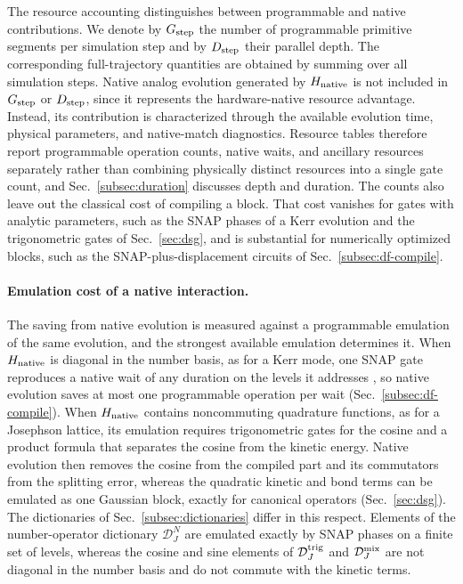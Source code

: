 \documentclass[pra,twocolumn,superscriptaddress,nofootinbib,floatfix]{revtex4-2}
\theoremstyle{remark}
\newcommand{\revcolor}{\color{blue}}
\DeclareRobustCommand{\rev}[1]{{\revcolor #1}}
\begin{document}
The resource accounting distinguishes between programmable and native contributions. We denote by \(G_{\rm step}\) the number of programmable primitive segments per simulation step and by \(D_{\rm step}\) their parallel depth. The corresponding full-trajectory quantities are obtained by summing over all simulation steps. Native analog evolution generated by \(H_{\rm native}\) is not included in \(G_{\rm step}\) or \(D_{\rm step}\), since it represents the hardware-native resource advantage. Instead, its contribution is characterized through the available evolution time, physical parameters, and native-match diagnostics. \rev{Resource tables therefore report programmable operation counts, native waits, and ancillary resources separately rather than combining physically distinct resources into a single gate count, and Sec.~\ref{subsec:duration} discusses depth and duration.} \rev{The counts also leave out the classical cost of compiling a block.} \rev{That cost vanishes for gates with analytic parameters, such as the SNAP phases of a Kerr evolution and the trigonometric gates of Sec.~\ref{sec:dsg}, and is substantial for numerically optimized blocks, such as the SNAP-plus-displacement circuits of Sec.~\ref{subsec:df-compile}.}

\paragraph{\rev{Emulation cost of a native interaction.}}
\rev{The saving from native evolution is measured against a programmable emulation of the same evolution, and the strongest available emulation determines it.} \rev{When \(H_{\rm native}\) is diagonal in the number basis, as for a Kerr mode, one SNAP gate reproduces a native wait of any duration on the levels it addresses \cite{Krastanov_2015,Heeres_2015}, so native evolution saves at most one programmable operation per wait (Sec.~\ref{subsec:df-compile}).} \rev{When \(H_{\rm native}\) contains noncommuting quadrature functions, as for a Josephson lattice, its emulation requires trigonometric gates for the cosine and a product formula that separates the cosine from the kinetic energy.} \rev{Native evolution then removes the cosine from the compiled part and its commutators from the splitting error, whereas the quadratic kinetic and bond terms can be emulated as one Gaussian block, exactly for canonical operators (Sec.~\ref{sec:dsg}).} \rev{The dictionaries of Sec.~\ref{subsec:dictionaries} differ in this respect.} \rev{Elements of the number-operator dictionary \(\mathcal D_J^{N}\) are emulated exactly by SNAP phases on a finite set of levels, whereas the cosine and sine elements of \(\mathcal D_J^{\rm trig}\) and \(\mathcal D_J^{\rm mix}\) are not diagonal in the number basis and do not commute with the kinetic terms.}
\end{document}

